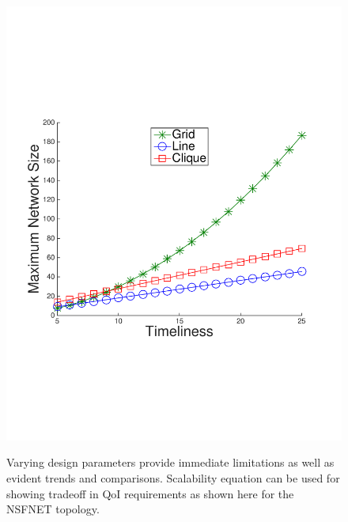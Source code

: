 \begin{figure}
{	\includegraphics[scale=0.28, clip=true, trim=14mm 65mm 23mm 65mm]{figures/use_cases_examples/cluster/num_nodes_vs_tness_cluster_color.pdf}
        \label{fig:use_case_num_nodes_vs_qoi_2}
        }
   \vspace{-1mm}
   \caption{Varying design parameters provide immediate limitations as well as evident trends and comparisons. Scalability equation can be used for showing tradeoff in QoI requirements as shown here for the NSFNET topology. }
   \label{fig:huh_net_design}
   \vspace{-6mm}
\end{figure}

